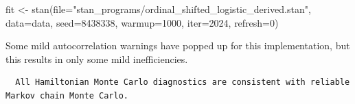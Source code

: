 \documentclass[
  letterpaper,
  DIV=11,
  numbers=noendperiod]{scrartcl}
\newenvironment{Shaded}{\begin{snugshade}}{\end{snugshade}}
\newcommand{\AttributeTok}[1]{\textcolor[rgb]{0.40,0.45,0.13}{#1}}
\newcommand{\ConstantTok}[1]{\textcolor[rgb]{0.56,0.35,0.01}{#1}}
\newcommand{\DecValTok}[1]{\textcolor[rgb]{0.68,0.00,0.00}{#1}}
\newcommand{\FunctionTok}[1]{\textcolor[rgb]{0.28,0.35,0.67}{#1}}
\newcommand{\NormalTok}[1]{\textcolor[rgb]{0.00,0.23,0.31}{#1}}
\newcommand{\OtherTok}[1]{\textcolor[rgb]{0.00,0.23,0.31}{#1}}
\newcommand{\SpecialCharTok}[1]{\textcolor[rgb]{0.37,0.37,0.37}{#1}}
\newcommand{\StringTok}[1]{\textcolor[rgb]{0.13,0.47,0.30}{#1}}
\begin{document}
\begin{Shaded}
\begin{Highlighting}[]
\NormalTok{fit }\OtherTok{\textless{}{-}} \FunctionTok{stan}\NormalTok{(}\AttributeTok{file=}\StringTok{"stan\_programs/ordinal\_shifted\_logistic\_derived.stan"}\NormalTok{,}
            \AttributeTok{data=}\NormalTok{data, }\AttributeTok{seed=}\DecValTok{8438338}\NormalTok{,}
            \AttributeTok{warmup=}\DecValTok{1000}\NormalTok{, }\AttributeTok{iter=}\DecValTok{2024}\NormalTok{, }\AttributeTok{refresh=}\DecValTok{0}\NormalTok{)}
\end{Highlighting}
\end{Shaded}

Some mild autocorrelation warnings have popped up for this
implementation, but this results in only some mild inefficiencies.

\begin{Shaded}
\end{Shaded}

\begin{verbatim}
  All Hamiltonian Monte Carlo diagnostics are consistent with reliable
Markov chain Monte Carlo.
\end{verbatim}

\begin{Shaded}
\end{Shaded}
\end{document}
